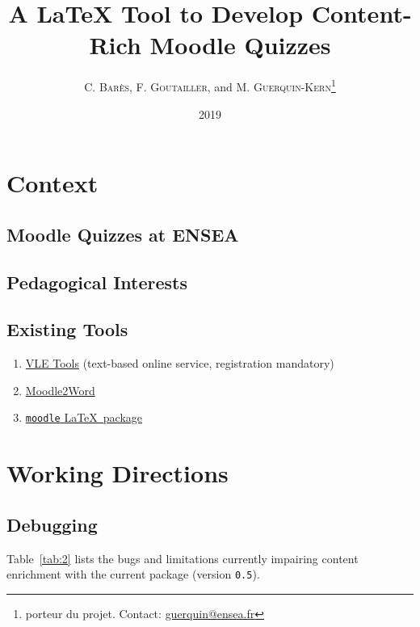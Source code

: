 \documentclass[twocolumn,a4paper,9pt]{article}
\title{A \LaTeX{} Tool to Develop Content-Rich Moodle Quizzes}
\author{C. \textsc{Barès}, F. \textsc{Goutailler}, and M. 
\textsc{Guerquin-Kern}\footnote{porteur du 
projet. Contact: \href{mailto:guerquin@ensea.fr}{guerquin@ensea.fr}}}
\date{2019}
\begin{document}
\maketitle
\tableofcontents

\section{Context}

\subsection{Moodle Quizzes at ENSEA}


\subsection{Pedagogical Interests}

\subsection{Existing Tools}

\begin{enumerate}
	\item \href{http://www.vletools.com}{VLE Tools} (text-based online service, 
	registration mandatory)
	\item \href{https://docs.moodle.org/34/en/Word_table_format}{Moodle2Word}
	\item \href{https://www.ctan.org/pkg/moodle}{\texttt{moodle} \LaTeX\ 
	package}
\end{enumerate}


\section{Working Directions}

\subsection{Debugging}

Table~\ref{tab:2} lists the bugs and limitations currently impairing content 
enrichment with the current package (version \texttt{0.5}).
\end{document}
